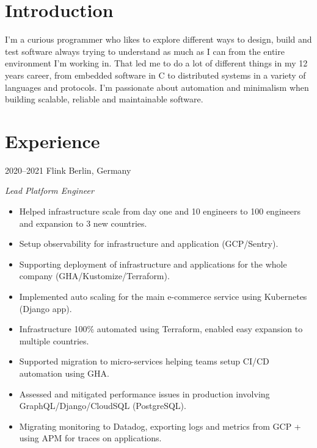 \documentclass[]{friggeri-cv} %
\begin{document}

\section{Introduction}

\begin{entrylist}
\entry
{}
{}
{}
{
I'm a curious programmer who likes to explore different ways to design, build and test software
always trying to understand as much as I can from the entire environment I'm working in.
That led me to do a lot of different things in my 12 years career, from embedded
software in C to distributed systems in a variety of languages and protocols.
I'm passionate about automation and minimalism when building scalable, reliable
and maintainable software.
}
\end{entrylist}


\section{Experience}

\begin{entrylist}
\entry
{2020--2021}
{Flink}
{Berlin, Germany}
{\emph{Lead Platform Engineer} \\

\begin{itemize}
  \item Helped infrastructure scale from day one and 10 engineers to 100 engineers and expansion to 3 new countries.
  \item Setup observability for infrastructure and application (GCP/Sentry).
  \item Supporting deployment of infrastructure and applications for the whole company (GHA/Kustomize/Terraform).
  \item Implemented auto scaling for the main e-commerce service using Kubernetes (Django app).
  \item Infrastructure 100\% automated using Terraform, enabled easy expansion to multiple countries.
  \item Supported migration to micro-services helping teams setup CI/CD automation using GHA.
  \item Assessed and mitigated performance issues in production involving GraphQL/Django/CloudSQL (PostgreSQL).
  \item Migrating monitoring to Datadog, exporting logs and metrics from GCP + using APM for traces on applications.
\end{itemize}

}
\end{entrylist}
\end{document}
